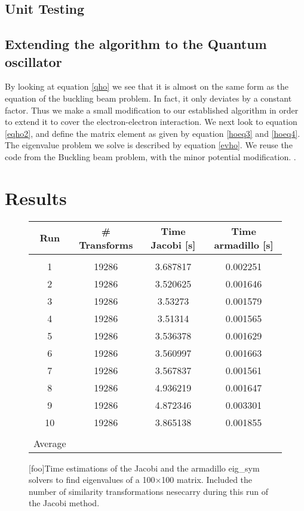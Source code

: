 \documentclass[%
reprint,
amsmath,amssymb,
aps,
]{revtex4-1}
\begin{document}
\subsection{Unit Testing}

\subsection{Extending the algorithm to the Quantum oscillator} \noindent 
By looking at equation \ref{qho} we see that it is almost on the same form as the equation of the buckling beam problem. In fact, it only deviates by a constant factor. Thus we make a small modification to our established algorithm in order to extend it to cover the electron-electron interaction. We next look to equation \ref{eqho2}, and define the matrix element as given by equation \ref{hoeq3} and \ref{hoeq4}. The eigenvalue problem we solve is described by equation \ref{evho}. We reuse the code from the Buckling beam problem, with the minor potential modification.
\newpage.
\newpage 

\section*{Results}
\begin{figure}[!h]
	\begin{tabular} {|c|c|c|c|}
		\hline
		Run & \# Transforms & Time Jacobi [s] & Time armadillo [s] \\ 
		\hline
		&&& \\ 
		1 & 19286 & 3.687817             & 0.002251            \\ 
		2 & 19286 & 3.520625             & 0.001646            \\ 
		3 & 19286 & 3.53273             & 0.001579            \\ 
		4 & 19286 & 3.51314             & 0.001565            \\ 
		5 & 19286 & 3.536378             & 0.001629            \\ 
		6 & 19286 & 3.560997             & 0.001663            \\ 
		7 & 19286 & 3.567837             & 0.001561            \\ 
		8 & 19286 & 4.936219             & 0.001647            \\ 
		9 & 19286 & 4.872346             & 0.003301            \\ 
		10 & 19286 & 3.865138             & 0.001855            \\ 
		\hline 
		& & &\\
		Average &&& \\ 
		\hline
	\end{tabular}
	\label{tab1}
	[foo]{Time estimations of the Jacobi and the armadillo eig\_sym solvers to find eigenvalues of a 100$\times$100 matrix. Included the number of similarity transformations nesecarry during this run of the Jacobi method.}
\end{figure}
\end{document}
